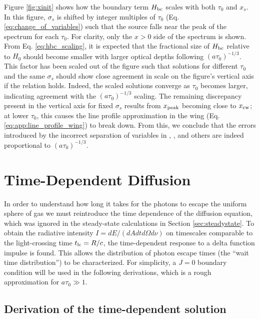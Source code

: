 \documentclass{aastex63}
\begin{document}
Figure \ref{fig:xinit} shows how the boundary term $H_{\rm bc}$ scales with both $\tau_0$ and $x_s$. In this figure, $\sigma_s$ is shifted by integer multiples of $\tau_0$ (Eq. \ref{eq:change_of_variables}) such that the source falls near the peak of the spectrum for each $\tau_0$. For clarity, only the $x > 0$ side of the spectrum is shown. From Eq. \ref{eq:hbc_scaling}, it is expected that the fractional size of $H_{\rm bc}$ relative to $H_0$ should become smaller with larger optical depths following $(a\tau_0)^{-1/3}$. This factor has been scaled out of the figure such that solutions for different $\tau_0$ and the same $\sigma_s$ should show close agreement in scale on the figure's vertical axis if the relation holds. Indeed, the scaled solutions converge as $\tau_0$ becomes larger, indicating agreement with the $(a\tau_0)^{-1/3}$ scaling. The remaining discrepancy present in the vertical axis for fixed $\sigma_s$ results from $x_{\rm peak}$ becoming close to $x_{\rm cw}$; at lower $\tau_0$, this causes the line profile approximation in the wing (Eq. \ref{eq:app:line_profile_wing}) to break down. From this, we conclude that the errors introduced by the incorrect separation of variables in \cite{1973MNRAS.162...43H}, \cite{1990ApJ...350..216N}, \cite{2006ApJ...649...14D} and others are indeed proportional to $(a\tau_0)^{-1/3}$.

\section{Time-Dependent Diffusion}
\label{sec:time_dependent}

In order to understand how long it takes for the photons to escape the uniform sphere of gas we must reintroduce the time dependence of the diffusion equation, which was ignored in the steady-state calculations in Section \ref{sec:steadystate}. To obtain the radiative intensity $I=dE/(dAdtd\Omega d\nu)$ on timescales comparable to the light-crossing time $t_{\rm lc} = R/c$, the time-dependent response to a delta function impulse is found. This allows the distribution of photon escape times (the ``wait time distribution'') to be characterized. For simplicity, a $J=0$ boundary condition will be used in the following derivations, which is a rough approximation for $a\tau_0 \gg 1$. 

\subsection{Derivation of the time-dependent solution}
\label{subsec:time_dependent:background}
\end{document}
